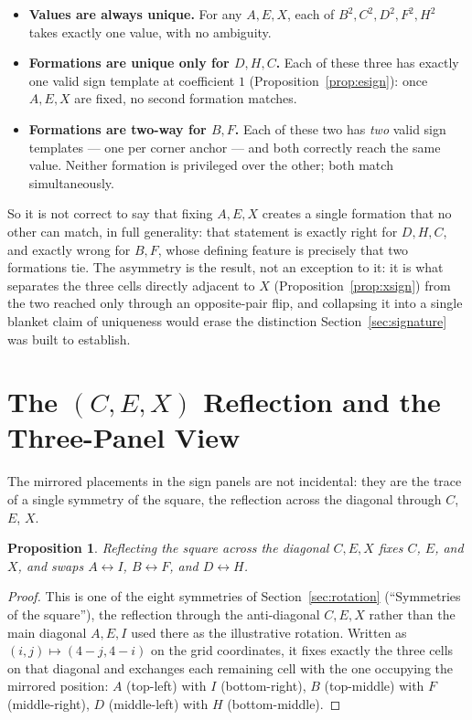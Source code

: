 \documentclass[12pt]{article}
\newtheorem{proposition}[theorem]{Proposition}
\theoremstyle{remark}
\begin{document}
\begin{itemize}
\item \textbf{Values are always unique.} For any $A,E,X$, each of
$B^2,C^2,D^2,F^2,H^2$ takes exactly one value, with no ambiguity.
\item \textbf{Formations are unique only for $D,H,C$.} Each of these
three has exactly one valid sign template at coefficient $1$
(Proposition~\ref{prop:esign}): once $A,E,X$ are fixed, no second
formation matches.
\item \textbf{Formations are two-way for $B,F$.} Each of these two has
\emph{two} valid sign templates --- one per corner anchor --- and both
correctly reach the same value. Neither formation is privileged over
the other; both match simultaneously.
\end{itemize}

So it is not correct to say that fixing $A,E,X$ creates a single
formation that no other can match, in full generality: that statement
is exactly right for $D,H,C$, and exactly wrong for $B,F$, whose
defining feature is precisely that two formations tie. The asymmetry
is the result, not an exception to it: it is what separates the three
cells directly adjacent to $X$ (Proposition~\ref{prop:xsign}) from the
two reached only through an opposite-pair flip, and collapsing it
into a single blanket claim of uniqueness would erase the distinction
Section~\ref{sec:signature} was built to establish.

\section{The $(C,E,X)$ Reflection and the Three-Panel View}\label{sec:reflection}

The mirrored placements in the sign panels are not incidental: they
are the trace of a single symmetry of the square, the reflection
across the diagonal through $C$, $E$, $X$.

\begin{proposition}\label{prop:cexreflection}
Reflecting the square across the diagonal $C,E,X$ fixes $C$, $E$, and
$X$, and swaps $A\leftrightarrow I$, $B\leftrightarrow F$, and
$D\leftrightarrow H$.
\end{proposition}

\begin{proof}
This is one of the eight symmetries of Section~\ref{sec:rotation}
(``Symmetries of the square''), the reflection through the anti-diagonal
$C,E,X$ rather than the main diagonal $A,E,I$ used there as the
illustrative rotation. Written as $(i,j)\mapsto(4-j,4-i)$ on the grid
coordinates, it fixes exactly the three cells on that diagonal and
exchanges each remaining cell with the one occupying the mirrored
position: $A$ (top-left) with $I$ (bottom-right), $B$ (top-middle)
with $F$ (middle-right), $D$ (middle-left) with $H$ (bottom-middle).
\end{proof}
\end{document}

